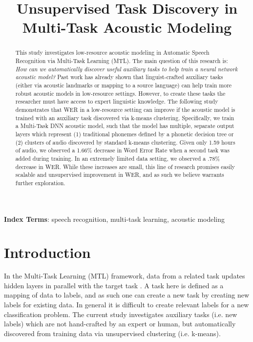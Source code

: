 \documentclass[a4paper]{article}
\title{Unsupervised Task Discovery in Multi-Task Acoustic Modeling}
\begin{document}
\maketitle
% 
\begin{abstract}

  This study investigates low-resource acoustic modeling in Automatic Speech Recognition via Multi-Task Learning (MTL). The main question of this research is: \textit{How can we automatically discover useful auxiliary tasks to help train a neural network acoustic model?} Past work has already shown that linguist-crafted auxiliary tasks (either via acoustic landmarks or mapping to a source language) can help train more robust acoustic models in low-resource settings. However, to create these tasks the researcher must have access to expert linguistic knowledge. The following study demonstrates that WER in a low-resource setting can improve if the acoustic model is trained with an auxiliary task discovered via k-means clustering. Specifically, we train a Multi-Task DNN acoustic model, such that the model has multiple, separate output layers which represent (1) traditional phonemes defined by a phonetic decision tree or (2) clusters of audio discovered by standard k-means clustering. Given only 1.59 hours of audio, we observed a 1.66\% decrease in Word Error Rate when a second task was added during training. In an extremely limited data setting, we observed a .78\% decrease in WER. While these increases are small, this line of research promises easily scalable and unsupervised improvement in WER, and as such we believe warrants further exploration.

  
\end{abstract}

\noindent\textbf{Index Terms}: speech recognition, multi-task learning, acoustic modeling





\section{Introduction}

In the Multi-Task Learning (MTL) framework, data from a related task updates hidden layers in parallel with the target task \cite{caruana1997}. A task here is defined as a mapping of data to labels, and as such one can create a new task by creating new labels for existing data. In general it is difficult to create relevant labels for a new classification problem. The current study investigates auxiliary tasks (i.e. new labels) which are not hand-crafted by an expert or human, but automatically discovered from training data via unsupervised clustering (i.e. k-means).
\end{document}
